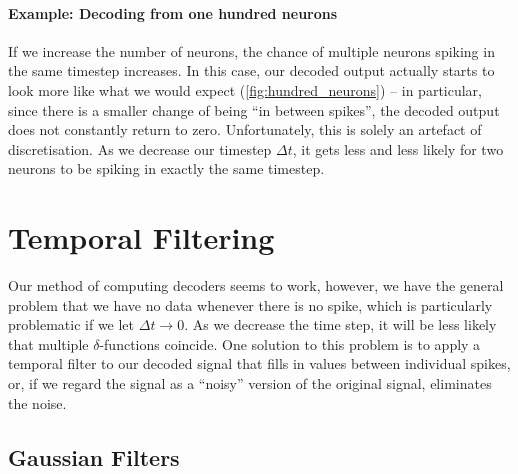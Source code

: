 \documentclass[10pt,letterpaper,oneside]{article}
\begin{document}
\paragraph{Example: Decoding from one hundred neurons}
If we increase the number of neurons, the chance of multiple neurons spiking in the same timestep increases. In this case, our decoded output actually starts to look more like what we would expect (\cref{fig:hundred_neurons}) -- in particular, since there is a smaller change of being \enquote{in between spikes}, the decoded output does not constantly return to zero. Unfortunately, this is solely an artefact of discretisation. As we decrease our timestep $\Delta t$, it gets less and less likely for two neurons to be spiking in exactly the same timestep.


\section{Temporal Filtering}

Our method of computing decoders seems to work, however, we have the general problem that we have no data whenever there is no spike, which is particularly problematic if we let $\Delta t \to 0$. As we decrease the time step, it will be less likely that multiple $\delta$-functions coincide. One solution to this problem is to apply a temporal filter to our decoded signal that fills in values between individual spikes, or, if we regard the signal as a \enquote{noisy} version of the original signal, eliminates the noise.

\subsection{Gaussian Filters}
\end{document}

